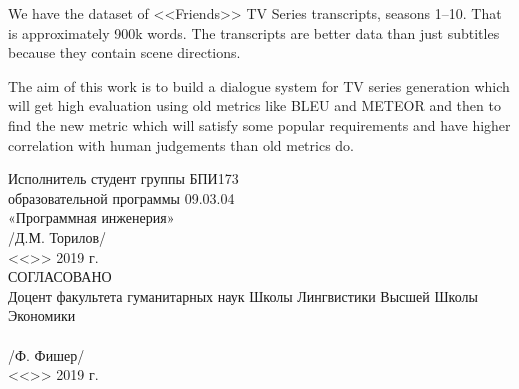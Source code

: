 \documentclass{article}
\newcommand{\signature}[1]{\underline{\hspace{10em}} /#1/}
\newcommand{\datefield}[1]{<<\underline{\hspace{1.8em}}>>\underline{\hspace{10.5em}} #1 г.}
\newcommand{\peoplefield}[3]{#1\\ \signature{#2} \\ \datefield{#3}}
\begin{document}
\begin{multicols}{2}
We have the dataset of <<Friends>> TV Series transcripts, seasons 1--10. That is approximately 900k words. The transcripts are better data than just subtitles because they contain scene directions.

The aim of this work is to build a dialogue system for TV series generation which will get high evaluation using old metrics like BLEU\cite{bleu} and METEOR\cite{meteor} and then to find the new metric which will satisfy some popular requirements\cite{how_not_to_evaluate} and have higher correlation with human judgements than old metrics do.




\end{multicols}

\newpage
\vspace*{\fill}
\begin{flushleft}
\begin{minipage}[t]{0.4\textwidth}
    \peoplefield{Исполнитель
    студент группы БПИ173\\
    образовательной программы
    09.03.04\\ «Программная
    инженерия»}{Д.М. Торилов}{2019}\\

    \peoplefield{СОГЛАСОВАНО\\Доцент факультета
    гуманитарных наук Школы Лингвистики Высшей
    Школы Экономики\\}{Ф. Фишер}{2019}
\end{minipage}
\end{flushleft}
 
\end{document}
